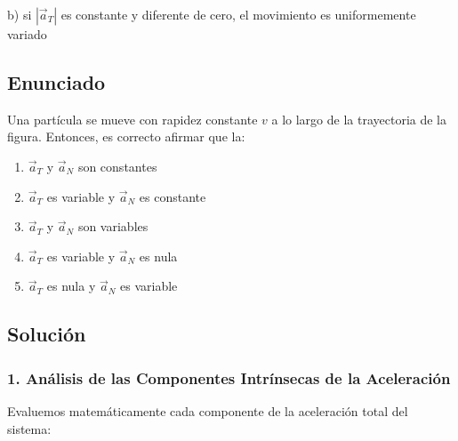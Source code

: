 \documentclass[12pt, a4paper]{article}
\begin{document}
\begin{tcolorbox}[colback=green!5!white, colframe=green!50!black, title=Respuesta Final]
\centering \Large b) si $|\vec{a}_T|$ es constante y diferente de cero, el movimiento es uniformemente variado
\end{tcolorbox}

\newpage

\subsection*{Enunciado}
Una partícula se mueve con rapidez constante $v$ a lo largo de la trayectoria de la figura. Entonces, es correcto afirmar que la:

\begin{center}
\end{center}

\begin{enumerate}[label=\alph*)]
    \item $\vec{a}_T$ y $\vec{a}_N$ son constantes
    \item $\vec{a}_T$ es variable y $\vec{a}_N$ es constante
    \item $\vec{a}_T$ y $\vec{a}_N$ son variables
    \item $\vec{a}_T$ es variable y $\vec{a}_N$ es nula
    \item $\vec{a}_T$ es nula y $\vec{a}_N$ es variable
\end{enumerate}

\subsection*{Solución}

\subsubsection*{1. Análisis de las Componentes Intrínsecas de la Aceleración}
Evaluemos matemáticamente cada componente de la aceleración total del sistema:
\end{document}
